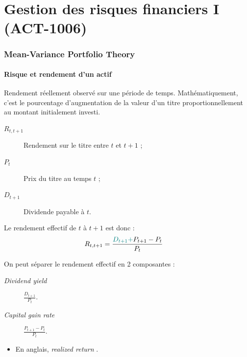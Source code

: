 \documentclass[10pt, french]{article}
\begin{document}
\part{Gestion des risques financiers I (ACT-1006)}
\begin{multicols*}{2}

\setcounter{section}{6}
\section{Mean-Variance Portfolio Theory}
\subsection{Risque et rendement d'un actif}
\begin{definitionNOHFILL}
Rendement réellement observé sur une période de temps. Mathématiquement, c'est le pourcentage d'augmentation de la valeur d'un titre proportionnellement au montant initialement investi.

\begin{distributions}[Notation]
\begin{description}
	\item[$R_{t, t + 1}$]	Rendement sur le titre entre $t$ et $t + 1$ ;
	\item[$P_{t}$]	Prix du titre au temps $t$ ;
	\item[$D_{t + 1}$]	Dividende payable à $t$.
\end{description}
\end{distributions}

Le rendement effectif de $t$ à $t + 1$ est donc :
\begin{align*}
R_{t, t + 1}
	&=	\frac{{\color{teal}D_{t + 1} + }P_{t + 1} - P_{t}}{P_{t}}
\end{align*}

On peut séparer le rendement effectif en 2 composantes :
\begin{description}
	\item[\og \textit{Dividend yield} \fg{}]	$\tfrac{D_{t + 1}}{P_{t}}$.
	\item[\og \textit{Capital gain rate} \fg{}]	$\tfrac{P_{t + 1} - P_{t}}{P_{t}}$.
\end{description}

\tcbline

\begin{itemize}
	\item	En anglais, \og \textit{realized return} \fg{}.
\end{itemize}



\end{definitionNOHFILL}
\end{multicols*}
\end{document}
